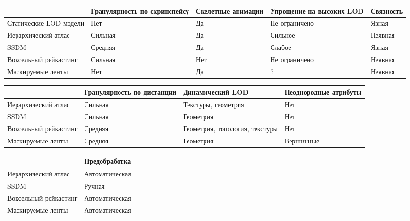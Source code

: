 \documentclass[12pt]{extarticle}
\begin{document}
\begin{center}
\small
\begin{tabular}{ p{24mm} | p{26mm} | p{18mm} | p{22mm} | p{16mm} }
                       & Гранулярность по скринспейсу & Скелетные анимации & Упрощение на высоких LOD & Связность \\
\hline
Статические LOD-модели & Нет                          & Да                 & Не ограничено            & Явная     \\
\hline
Иерархический атлас    & Сильная                      & Да                 & Сильное                  & Неявная   \\
\hline
SSDM                   & Средняя                      & Да                 & Слабое                   & Явная     \\
\hline
Воксельный рейкастинг  & Сильная                      & Нет                & Не ограничено            & Неявная   \\
\hline
Маскируемые ленты      & Нет                          & Да                 & ?                        & Неявная   \\
\end{tabular}
\end{center}

\begin{center}
\small
\begin{tabular}{ p{24mm} | p{24mm} | p{24mm} | p{24mm}  }
                      & Гранулярность по дистанции & Динамический LOD               & Неоднородные атрибуты \\
\hline
Иерархический атлас   & Сильная                    & Текстуры, геометрия            & Нет \\
\hline
SSDM                  & Сильная                    & Геометрия                      & Нет \\
\hline
Воксельный рейкастинг & Средняя                    & Геометрия, топология, текстуры & Нет \\
\hline
Маскируемые ленты     & Средняя                    & Геометрия                      & Вершинные \\
\end{tabular}
\end{center}

\begin{center}
\small
\begin{tabular}{ p{24mm} | p{24mm} }
                      & Предобработка  \\
\hline
Иерархический атлас   & Автоматическая \\
\hline
SSDM                  & Ручная         \\
\hline
Воксельный рейкастинг & Автоматическая \\
\hline
Маскируемые ленты     & Автоматическая \\
\end{tabular}
\end{center}
\end{document}
